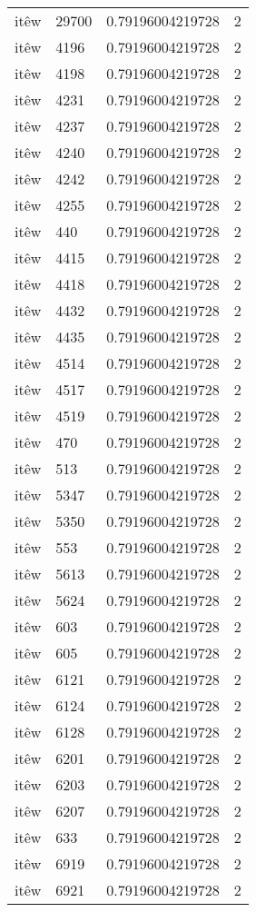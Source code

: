 \begin{longtable}{llll}
itêw & 29700 & 0.79196004219728 & 2\\
itêw & 4196 & 0.79196004219728 & 2\\
itêw & 4198 & 0.79196004219728 & 2\\
itêw & 4231 & 0.79196004219728 & 2\\
itêw & 4237 & 0.79196004219728 & 2\\
itêw & 4240 & 0.79196004219728 & 2\\
itêw & 4242 & 0.79196004219728 & 2\\
itêw & 4255 & 0.79196004219728 & 2\\
itêw & 440 & 0.79196004219728 & 2\\
itêw & 4415 & 0.79196004219728 & 2\\
itêw & 4418 & 0.79196004219728 & 2\\
itêw & 4432 & 0.79196004219728 & 2\\
itêw & 4435 & 0.79196004219728 & 2\\
itêw & 4514 & 0.79196004219728 & 2\\
itêw & 4517 & 0.79196004219728 & 2\\
itêw & 4519 & 0.79196004219728 & 2\\
itêw & 470 & 0.79196004219728 & 2\\
itêw & 513 & 0.79196004219728 & 2\\
itêw & 5347 & 0.79196004219728 & 2\\
itêw & 5350 & 0.79196004219728 & 2\\
itêw & 553 & 0.79196004219728 & 2\\
itêw & 5613 & 0.79196004219728 & 2\\
itêw & 5624 & 0.79196004219728 & 2\\
itêw & 603 & 0.79196004219728 & 2\\
itêw & 605 & 0.79196004219728 & 2\\
itêw & 6121 & 0.79196004219728 & 2\\
itêw & 6124 & 0.79196004219728 & 2\\
itêw & 6128 & 0.79196004219728 & 2\\
itêw & 6201 & 0.79196004219728 & 2\\
itêw & 6203 & 0.79196004219728 & 2\\
itêw & 6207 & 0.79196004219728 & 2\\
itêw & 633 & 0.79196004219728 & 2\\
itêw & 6919 & 0.79196004219728 & 2\\
itêw & 6921 & 0.79196004219728 & 2\\

\end{longtable}

